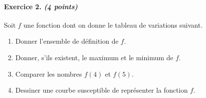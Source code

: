 \documentclass[11pt]{article}
\begin{document}
\paragraph{Exercice 2. \emph{(4 points)}} Soit $f$ une fonction dont on donne le tableau de
variations suivant.
\begin{center}
\end{center}
\begin{enumerate}[leftmargin=*]
  \item Donner l'ensemble de définition de $f$.
  \item Donner, s'ils existent, le maximum et le minimum de $f$.
  \item Comparer les nombres $f(4)$ et $f(5)$.
  \item Dessiner une courbe susceptible de représenter la fonction $f$.
\end{enumerate}


\newpage
\end{document}
